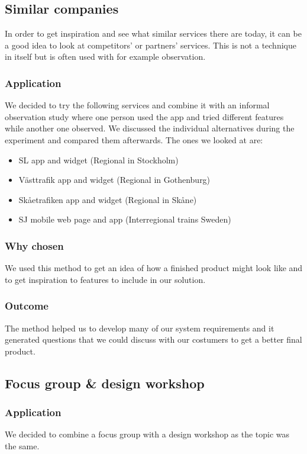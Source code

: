 \documentclass[a4paper]{article}
\begin{document}
    \subsection{Similar companies}
In order to get inspiration and see what similar services there are today, it can be a good idea to look at competitors' or partners' services. This is not a technique in itself but is often used with for example observation.
  
    \subsubsection{Application}
We decided to try the following services and combine it with an informal observation study where one person used the app and tried different features while another one observed. We discussed the individual alternatives during the experiment and compared them afterwards. The ones we looked at are:
\begin{itemize}
		\item SL app and widget (Regional in Stockholm)
		\item Västtrafik app and widget (Regional in Gothenburg)
		\item Skåetrafiken app and widget (Regional in Skåne)
		\item SJ mobile web page and app (Interregional trains Sweden)
	\end{itemize}
	
    \subsubsection{Why chosen}
We used this method to get an idea of how a finished product might look like
and to get inspiration to features to include in our solution.
    \subsubsection{Outcome}
The method helped us to develop many of our system requirements and it generated questions that we could discuss with our costumers to get a better final product.



\subsection{Focus group \& design workshop}
    \subsubsection{Application}
We decided to combine a focus group with a design workshop as the topic was the same.
	
\end{document}
